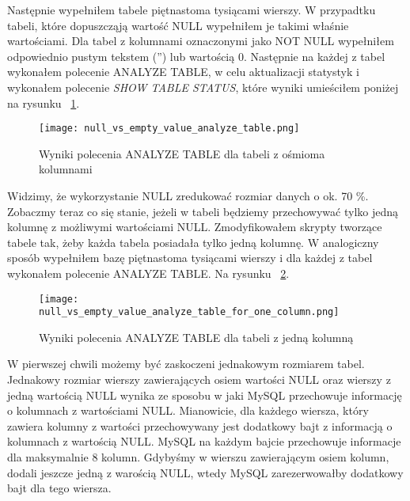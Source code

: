Następnie wypełniłem tabele piętnastoma tysiącami wierszy. W przypadtku tabeli, które dopuszcząją wartość NULL wypełniłem je takimi właśnie wartościami. Dla tabel z kolumnami oznaczonymi jako NOT NULL wypełniłem odpowiednio pustym tekstem ('') lub wartością 0.
Następnie na każdej z tabel wykonałem polecenie ANALYZE TABLE, w celu aktualizacji statystyk i wykonałem polecenie \textit{SHOW TABLE STATUS}, które wyniki umieściłem poniżej na rysunku ~\ref{fig:null_vs_empty_value_analyze_table}.

\begin{figure}
	\caption{Wyniki polecenia ANALYZE TABLE dla tabeli z ośmioma kolumnami}
	\centering
	\texttt{[image: null\_vs\_empty\_value\_analyze\_table.png]}
	\label{fig:null_vs_empty_value_analyze_table}
\end{figure}

Widzimy, że wykorzystanie NULL zredukować rozmiar danych o ok. 70 \%. Zobaczmy teraz co się stanie, jeżeli w tabeli będziemy przechowywać tylko jedną kolumnę z możliwymi wartościami NULL. Zmodyfikowałem skrypty tworzące tabele tak, żeby każda tabela posiadała tylko jedną kolumnę. W analogiczny sposób wypełniłem bazę piętnastoma tysiącami wierszy i dla każdej z tabel wykonałem polecenie ANALYZE TABLE. Na rysunku ~\ref{fig:null_vs_empty_value_analyze_table_for_one_column}.

\begin{figure}
	\caption{Wyniki polecenia ANALYZE TABLE dla tabeli z jedną kolumną}
	\centering
	\texttt{[image: null\_vs\_empty\_value\_analyze\_table\_for\_one\_column.png]}
	\label{fig:null_vs_empty_value_analyze_table_for_one_column}
\end{figure}

W pierwszej chwili możemy być zaskoczeni jednakowym rozmiarem tabel. Jednakowy rozmiar wierszy zawierających osiem wartości NULL oraz wierszy z jedną wartością NULL wynika ze sposobu w jaki MySQL przechowuje informację o kolumnach z wartościami NULL. Mianowicie, dla każdego wiersza, który zawiera kolumny z wartości przechowywany jest dodatkowy bajt z informacją o kolumnach z wartością NULL. MySQL na każdym bajcie przechowuje informacje dla maksymalnie 8 kolumn. Gdybyśmy w wierszu zawierającym osiem kolumn, dodali jeszcze jedną z warością NULL, wtedy MySQL zarezerwowałby dodatkowy bajt dla tego wiersza.